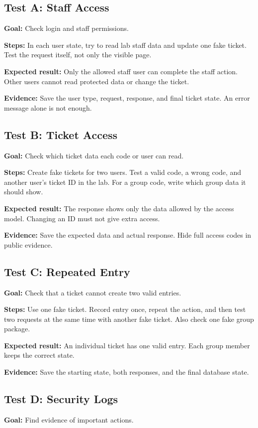 \documentclass[conference]{IEEEtran}
\begin{document}
\subsection{Test A: Staff Access}
\textbf{Goal:} Check login and staff permissions.

\textbf{Steps:} In each user state, try to read lab staff data and update one fake ticket. Test the request itself, not only the visible page.

\textbf{Expected result:} Only the allowed staff user can complete the staff action. Other users cannot read protected data or change the ticket.

\textbf{Evidence:} Save the user type, request, response, and final ticket state. An error message alone is not enough.

\subsection{Test B: Ticket Access}
\textbf{Goal:} Check which ticket data each code or user can read.

\textbf{Steps:} Create fake tickets for two users. Test a valid code, a wrong code, and another user's ticket ID in the lab. For a group code, write which group data it should show.

\textbf{Expected result:} The response shows only the data allowed by the access model. Changing an ID must not give extra access.

\textbf{Evidence:} Save the expected data and actual response. Hide full access codes in public evidence.

\subsection{Test C: Repeated Entry}
\textbf{Goal:} Check that a ticket cannot create two valid entries.

\textbf{Steps:} Use one fake ticket. Record entry once, repeat the action, and then test two requests at the same time with another fake ticket. Also check one fake group package.

\textbf{Expected result:} An individual ticket has one valid entry. Each group member keeps the correct state.

\textbf{Evidence:} Save the starting state, both responses, and the final database state.

\subsection{Test D: Security Logs}
\textbf{Goal:} Find evidence of important actions.
\end{document}

